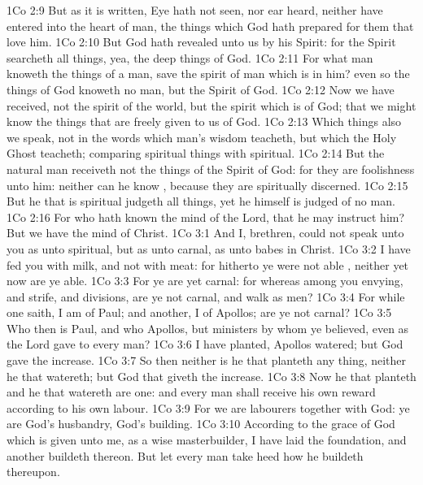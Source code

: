 \vs 1Co 2:9 But as it is written, Eye hath not seen, nor ear heard, neither have entered into the heart of man, the things which God hath prepared for them that love him.
\vs 1Co 2:10 But God hath revealed  unto us by his Spirit: for the Spirit searcheth all things, yea, the deep things of God.
\vs 1Co 2:11 For what man knoweth the things of a man, save the spirit of man which is in him? even so the things of God knoweth no man, but the Spirit of God.
\vs 1Co 2:12 Now we have received, not the spirit of the world, but the spirit which is of God; that we might know the things that are freely given to us of God.
\vs 1Co 2:13 Which things also we speak, not in the words which man's wisdom teacheth, but which the Holy Ghost teacheth; comparing spiritual things with spiritual.
\vs 1Co 2:14 But the natural man receiveth not the things of the Spirit of God: for they are foolishness unto him: neither can he know , because they are spiritually discerned.
\vs 1Co 2:15 But he that is spiritual judgeth all things, yet he himself is judged of no man.
\vs 1Co 2:16 For who hath known the mind of the Lord, that he may instruct him? But we have the mind of Christ.
\vs 1Co 3:1 And I, brethren, could not speak unto you as unto spiritual, but as unto carnal,  as unto babes in Christ.
\vs 1Co 3:2 I have fed you with milk, and not with meat: for hitherto ye were not able , neither yet now are ye able.
\vs 1Co 3:3 For ye are yet carnal: for whereas  among you envying, and strife, and divisions, are ye not carnal, and walk as men?
\vs 1Co 3:4 For while one saith, I am of Paul; and another, I  of Apollos; are ye not carnal?
\vs 1Co 3:5 Who then is Paul, and who  Apollos, but ministers by whom ye believed, even as the Lord gave to every man?
\vs 1Co 3:6 I have planted, Apollos watered; but God gave the increase.
\vs 1Co 3:7 So then neither is he that planteth any thing, neither he that watereth; but God that giveth the increase.
\vs 1Co 3:8 Now he that planteth and he that watereth are one: and every man shall receive his own reward according to his own labour.
\vs 1Co 3:9 For we are labourers together with God: ye are God's husbandry,  God's building.
\vs 1Co 3:10 According to the grace of God which is given unto me, as a wise masterbuilder, I have laid the foundation, and another buildeth thereon. But let every man take heed how he buildeth thereupon.
